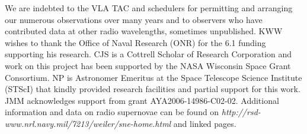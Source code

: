 \documentclass[12pt,preprint]{aastex}
\begin{document}
\acknowledgements
We are indebted to the VLA TAC and schedulers for permitting and
arranging our numerous observations over many years and to observers who have contributed
data at other radio wavelengths, sometimes unpublished. KWW wishes to
thank the Office of Naval Research (ONR) for the 6.1 funding supporting
his research.  CJS is a Cottrell Scholar of Research Corporation and work on this project has been supported by the NASA Wisconsin Space Grant Consortium. NP is Astronomer Emeritus at the Space Telescope Science Institute (STScI) that kindly provided research facilities and partial support for this work. JMM acknowledges support from grant AYA2006-14986-C02-02. Additional information and data on radio supernovae can be found on {\it http://rsd-www.nrl.navy.mil/7213/weiler/sne-home.html}
and linked pages.
\end{document}
